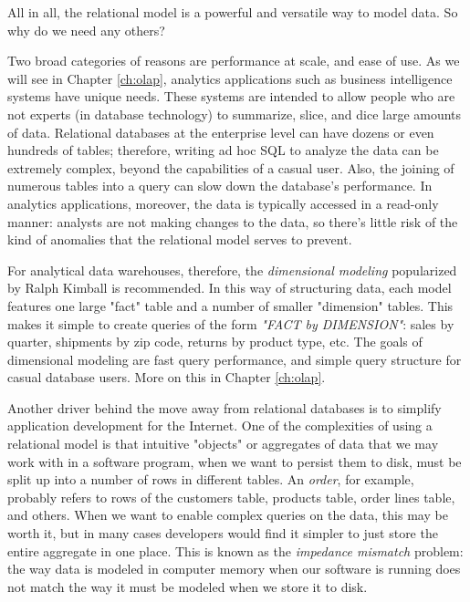 \documentclass[11pt]{book}
\newcommand{\term}[1]{\emph{#1}} %
\begin{document}
All in all, the relational model is a powerful and versatile way to model data.  So why do we need any others?  

Two broad categories of reasons are performance at scale, and ease of use.  As we will see in Chapter \ref{ch:olap}, analytics applications such as business intelligence systems have unique needs.  These systems are intended to allow people who are not experts (in database technology) to summarize, slice, and dice large amounts of data.  Relational databases at the enterprise level can have dozens or even hundreds of tables; therefore, writing ad hoc SQL to analyze the data can be extremely complex, beyond the capabilities of a casual user.  Also, the joining of numerous tables into a query can slow down the database's performance.  In analytics applications, moreover, the data is typically accessed in a read-only manner: analysts are not making changes to the data, so there's little risk of the kind of anomalies that the relational model serves to prevent.

For analytical data warehouses, therefore, the \term{dimensional modeling} popularized by Ralph Kimball is recommended.  In this way of structuring data, each model features one large "fact" table and a number of smaller "dimension" tables.  This makes it simple to create queries of the form \emph{"FACT by DIMENSION"}: sales by quarter, shipments by zip code, returns by product type, etc.  The goals of dimensional modeling are fast query performance, and simple query structure for casual database users.  More on this in Chapter \ref{ch:olap}.

Another driver behind the move away from relational databases is to simplify application development for the Internet.  One of the complexities of using a relational model is that intuitive "objects" or aggregates of data that we may work with in a software program, when we want to persist them to disk, must be split up into a number of rows in different tables.  An \emph{order}, for example, probably refers to rows of the customers table, products table, order lines table, and others.  When we want to enable complex queries on the data, this may be worth it, but in many cases developers would find it simpler to just store the entire aggregate in one place.  This is known as the \term{impedance mismatch} problem: the way data is modeled in computer memory when our software is running does not match the way it must be modeled when we store it to disk.
\end{document}
